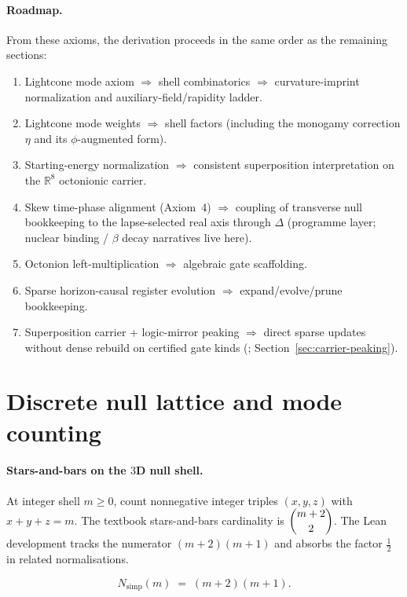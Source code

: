 \documentclass[11pt,a4paper]{article}
\newcommand{\lean}[1]{\path{#1}}
\theoremstyle{remark}
\begin{document}
\paragraph{Roadmap.}
From these axioms, the derivation proceeds in the same order as the remaining sections:
\begin{enumerate}
  \item Lightcone mode axiom $\Rightarrow$ shell combinatorics $\Rightarrow$ curvature-imprint normalization and auxiliary-field/rapidity ladder.
  \item Lightcone mode weights $\Rightarrow$ shell factors (including the monogamy correction $\eta$ and its $\phi$-augmented form).
  \item Starting-energy normalization $\Rightarrow$ consistent superposition interpretation on the $\mathbb{R}^8$ octonionic carrier.
  \item Skew time-phase alignment (Axiom~4) $\Rightarrow$ coupling of transverse null bookkeeping to the lapse-selected real axis through $\Delta$ (programme layer; nuclear binding / $\beta$ decay narratives live here).
  \item Octonion left-multiplication $\Rightarrow$ algebraic gate scaffolding.
  \item Sparse horizon-causal register evolution $\Rightarrow$ expand/evolve/prune bookkeeping.
  \item Superposition carrier + logic-mirror peaking $\Rightarrow$ direct sparse updates without dense rebuild on certified gate kinds (\lean{CarrierPeaking}; Section~\ref{sec:carrier-peaking}).
\end{enumerate}

\section{Discrete null lattice and mode counting}

\paragraph{Stars-and-bars on the $3$D null shell.}
At integer shell $m\ge 0$, count nonnegative integer triples $(x,y,z)$ with $x+y+z=m$. The textbook stars-and-bars cardinality is $\dbinom{m+2}{2}$. The Lean development tracks the numerator $(m+2)(m+1)$ and absorbs the factor $\tfrac12$ in related normalisations.

\begin{equation}
  N_{\mathrm{simp}}(m) \;=\; (m+2)(m+1).
\end{equation}
\end{document}
